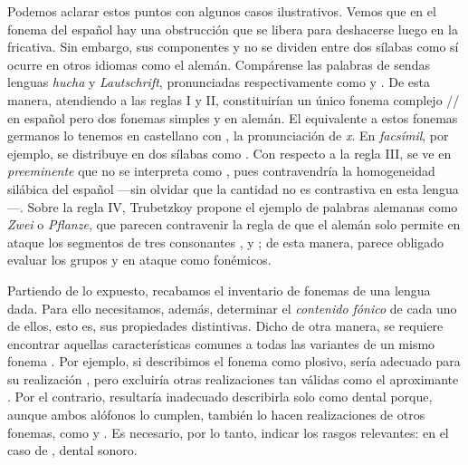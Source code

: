 Podemos aclarar estos puntos con algunos casos ilustrativos. Vemos que en el fonema  del español hay una obstrucción que se libera para deshacerse luego en la fricativa. Sin embargo, sus componentes \ipa{[t]} y \ipa{[ʃ]} no se dividen entre dos sílabas como sí ocurre en otros idiomas como el alemán. Compárense las palabras de sendas lenguas \textit{hucha} y \textit{Lautschrift}, pronunciadas respectivamente como  y . De esta manera, atendiendo a las reglas I y II, \ipa{[tʃ]} constituirían un único fonema complejo // en español pero dos fonemas simples  y  en alemán. El equivalente a estos fonemas germanos lo tenemos en castellano con  , la pronunciación de \textit{x}. En \textit{facsímil}, por ejemplo, se distribuye en dos sílabas como . Con respecto a la regla III, se ve en \textit{preeminente} que no se interpreta como , pues contravendría la homogeneidad silábica del español —sin olvidar que la cantidad no es contrastiva en esta lengua—. Sobre la regla IV, Trubetzkoy propone el ejemplo de palabras alemanas como \textit{Zwei} o \textit{Pflanze}, que parecen contravenir la regla de que el alemán solo permite en ataque los segmentos de tres consonantes \ipa{[ʃtr]}, \ipa{[ʃpl]} y \ipa{[ʃpr]}; de esta manera, parece obligado evaluar los grupos \ipa{[ts]} y \ipa{[pf]} en ataque como fonémicos.

Partiendo de lo expuesto, recabamos el inventario de fonemas de una lengua dada. Para ello necesitamos, además, determinar el \textit{contenido fónico} de cada uno de ellos, esto es, sus propiedades distintivas. Dicho de otra manera, se requiere encontrar aquellas características comunes a todas las variantes de un mismo fonema \parencite[59]{trubetzkoy1939}. Por ejemplo, si describimos el fonema  como plosivo, sería adecuado para su realización \ipa{[d]}, pero excluiría otras realizaciones tan válidas como el aproximante \ipa{[ð]}. Por el contrario, resultaría inadecuado describirla solo como dental porque, aunque ambos alófonos lo cumplen, también lo hacen realizaciones de otros fonemas, como  \ipa{[t]} y \ipa{[θ]}. Es necesario, por lo tanto, indicar los rasgos relevantes: en el caso de , dental sonoro.

